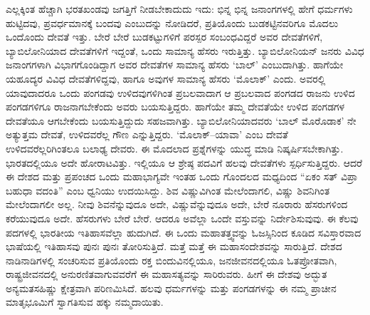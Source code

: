 ಎಲ್ಲಕ್ಕಿಂತ ಹೆಚ್ಚಾಗಿ ಭರತಖಂಡವು ಜಗತ್ತಿಗೆ ನೀಡಬೇಕಾದುದು ಇದು: ಭಿನ್ನ ಭಿನ್ನ ಜನಾಂಗಗಳಲ್ಲಿ ಹೇಗೆ ಧರ್ಮಗಳು ಹುಟ್ಟಿದವು, ಪ್ರವರ್ಧಮಾನಕ್ಕೆ ಬಂದವು ಎಂಬುದನ್ನು ನೋಡಿದರೆ, ಪ್ರತಿಯೊಂದು ಬುಡಕಟ್ಟಿನವರಿಗೂ ಮೊದಲು ಒಂದೊಂದು ದೇವತೆ ಇತ್ತು. ಬೇರೆ ಬೇರೆ ಬುಡಕಟ್ಟುಗಳಿಗೆ ಪರಸ್ಪರ ಸಂಬಂಧವಿದ್ದರೆ ಅವರ ದೇವತೆಗಳಿಗೆ, ಬ್ಯಾಬಿಲೋನಿಯಾದ ದೇವತೆಗಳಿಗೆ ಇದ್ದಂತೆ, ಒಂದು ಸಾಮಾನ್ಯ ಹೆಸರು ಇರುತ್ತಿತ್ತು. ಬ್ಯಾಬಿಲೋನಿಯನ್​ ಜನರು ವಿವಿಧ ಜನಾಂಗಗಳಾಗಿ ವಿಭಾಗಗೊಂಡಿದ್ದಾಗ ಅವರ ದೇವತೆಗಳ ಸಾಮಾನ್ಯ ಹೆಸರು ‘ಬಾಲ್​’ ಎಂಬುದಾಗಿತ್ತು. ಹಾಗೆಯೇ ಯಹೂದ್ಯರ ವಿವಿಧ ದೇವತೆಗಳಿದ್ದವು, ಹಾಗೂ ಅವುಗಳ ಸಾಮಾನ್ಯ ಹೆಸರು ‘ಮೊಲಾಕ್​’ ಎಂದು. ಅವರಲ್ಲಿ ಯಾವುದಾದರೂ ಒಂದು ಪಂಗಡವು ಉಳಿದವುಗಳಿಗಿಂತ ಪ್ರಬಲವಾದಾಗ ಆ ಪ್ರಬಲವಾದ ಪಂಗಡದ ರಾಜನು ಉಳಿದ ಪಂಗಡಗಳಿಗೂ ರಾಜನಾಗಬೇಕೆಂದು ಅವರು ಬಯಸುತ್ತಿದ್ದರು. ಹಾಗೆಯೇ ತಮ್ಮ ದೇವತೆಯೇ ಉಳಿದ ಪಂಗಡಗಳ ದೇವತೆಯೂ ಆಗಬೇಕೆಂದು ಬಯಸುತ್ತಿದ್ದುದು ಸಹಜವಾಗಿತ್ತು. ಬ್ಯಾಬಿಲೋನಿಯಾದವರು ‘ಬಾಲ್​ ಮೊರೊಡಾಕ’ ನೇ ಅತ್ಯುತ್ತಮ ದೇವತೆ, ಉಳಿದವರೆಲ್ಲ ಗೌಣ ಎನ್ನುತ್ತಿದ್ದರು. ‘ಮೊಲಾಕ್​–ಯಾವಾ’ ಎಂಬ ದೇವತೆ ಉಳಿದವರೆಲ್ಲರಿಗಿಂತಲೂ ಬಲಾಢ್ಯ ದೇವರು. ಈ ಮೊದಲಾದ ಪ್ರಶ್ನೆಗಳನ್ನು ಯುದ್ಧ ಮಾಡಿ ನಿಷ್ಕರ್ಷಿಸಬೇಕಾಗಿತ್ತು. ಭಾರತದಲ್ಲಿಯೂ ಅದೇ ಹೋರಾಟವಿತ್ತು. ಇಲ್ಲಿಯೂ ಆ ಶ್ರೇಷ್ಠ ಪದವಿಗೆ ಹಲವು ದೇವತೆಗಳು ಸ್ಪರ್ಧಿಸುತ್ತಿದ್ದರು. ಆದರೆ ಈ ದೇಶದ ಮತ್ತು ಪ್ರಪಂಚದ ಒಂದು ಮಹಾಭಾಗ್ಯವೇ ಇಂತಹ ಒಂದು ಗೊಂದಲದ ಮಧ್ಯದಿಂದ “ಏಕಂ ಸತ್​ ವಿಪ್ರಾ ಬಹುಧಾ ವದಂತಿ” ಎಂಬ ಧ್ವನಿಯು ಉದಯಿಸಿದ್ದು. ಶಿವ ವಿಷ್ಣುವಿಗಿಂತ ಮೇಲೆಂದಾಗಲಿ, ವಿಷ್ಣು ಶಿವನಿ\-ಗಿಂತ ಮೇಲೆಂದಾಗಲೀ ಅಲ್ಲ. ನೀವು ಶಿವನೆನ್ನುವುದೂ ಅದೇ, ವಿಷ್ಣುವೆನ್ನುವುದೂ ಅದೇ, ಬೇರೆ ನೂರಾರು ಹೆಸರುಗಳಿಂದ ಕರೆಯುವುದೂ ಅದೇ. ಹೆಸರುಗಳು ಬೇರೆ ಬೇರೆ. ಆದರೂ ಅವೆಲ್ಲಾ ಒಂದೇ ವಸ್ತುವನ್ನು ನಿರ್ದೇಶಿಸುವುವು. ಈ ಕೆಲವು ಪದಗಳಲ್ಲಿ ಭಾರತೀಯ ಇತಿಹಾಸವೆಲ್ಲಾ ಹುದುಗಿದೆ. ಈ ಒಂದು ಮಹಾತತ್ತ್ವವನ್ನು ಓಜಸ್ಸಿನಿಂದ ಕೂಡಿದ ಸವಿಸ್ತಾರವಾದ ಭಾಷೆಯಲ್ಲಿ ಇತಿಹಾಸವು ಪುನಃ ಪುನಃ ತೋರಿಸುತ್ತಿದೆ. ಮತ್ತೆ ಮತ್ತೆ ಈ ಮಹಾಸಂದೇಶವನ್ನು ಸಾರುತ್ತಿದೆ. ದೇಶದ ನಾಡಿನಾಡಿಗಳಲ್ಲಿ ಸಂಚರಿಸುವ ಪ್ರತಿಯೊಂದು ರಕ್ತ ಬಿಂದುವಿನಲ್ಲಿಯೂ, ಜನಜೀವನದಲ್ಲಿಯೂ ಓತಪ್ರೋತವಾಗಿ, ರಾಷ್ಟ್ರಜೀವನದಲ್ಲಿ ಅನುರಣಿತವಾಗುವವರೆಗೆ ಈ ಮಹಾಸತ್ಯವನ್ನು ಸಾರಿರುವರು. ಹೀಗೆ ಈ ದೇಶವು ಅದ್ಭುತ ಅನ್ಯಮತಸಹಿಷ್ಣು ಕ್ಷೇತ್ರವಾಗಿ ಪರಿಣಮಿಸಿದೆ. ಹಲವು ಧರ್ಮಗಳನ್ನು ಮತ್ತು ಪಂಗಡಗಳನ್ನು ಈ ನಮ್ಮ ಪ್ರಾಚೀನ ಮಾತೃಭೂಮಿಗೆ ಸ್ವಾಗತಿಸುವ ಹಕ್ಕು ನಮ್ಮ\-ದಾಯಿತು.

